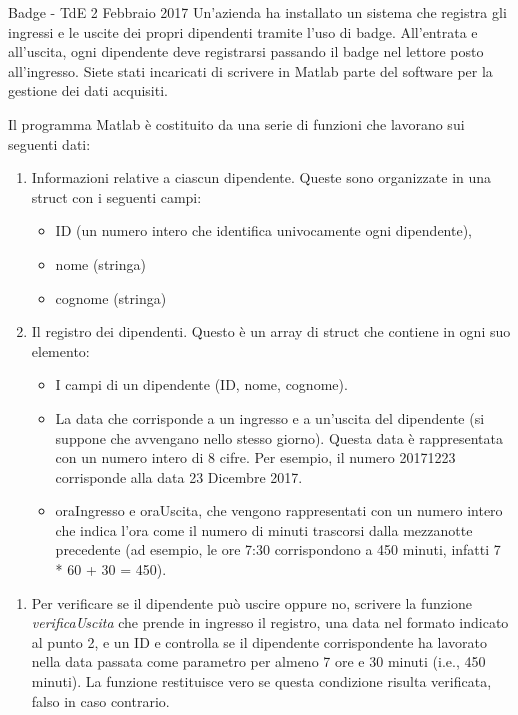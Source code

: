 \documentclass[format=169, 10pt, handout]{beamer}
\begin{document}
\begin{frame}[allowframebreaks]{Badge - TdE 2 Febbraio 2017}
Un'azienda ha installato un sistema che registra gli ingressi e le uscite dei propri dipendenti tramite
l'uso di badge.
All'entrata e all'uscita, ogni dipendente deve registrarsi passando il badge nel lettore
posto all'ingresso.
Siete stati incaricati di scrivere in Matlab parte del software per la gestione dei
dati acquisiti.

\framebreak

Il programma Matlab è costituito da una serie di funzioni che lavorano sui seguenti dati:
\begin{enumerate}
\item Informazioni relative a ciascun dipendente. Queste sono organizzate in una struct con i
seguenti campi:
\begin{itemize}
\item ID (un numero intero che identifica univocamente ogni dipendente),
\item nome (stringa)
\item  cognome (stringa)
\end{itemize}
\item Il registro dei dipendenti. Questo è un array di struct che contiene in ogni suo elemento:
\begin{itemize}
\item I campi di un dipendente (ID, nome, cognome).
\item La data che corrisponde a un ingresso e a un’uscita del dipendente (si suppone che
avvengano nello stesso giorno).
 Questa data è rappresentata con un numero intero di 8 cifre. Per esempio, il numero 20171223 corrisponde alla data 23 Dicembre 2017.
\item oraIngresso e oraUscita, che vengono rappresentati con un numero intero che indica
l’ora come il numero di minuti trascorsi dalla mezzanotte precedente (ad esempio, le
ore 7:30 corrispondono a 450 minuti, infatti 7 * 60 + 30 = 450).
\end{itemize}
\end{enumerate}

\framebreak

\begin{enumerate}
	\item Per verificare se il dipendente può uscire oppure no, scrivere la funzione \emph{verificaUscita} che prende in ingresso il registro, una data nel formato indicato al punto 2, e un ID e controlla se il
dipendente corrispondente ha lavorato nella data passata come parametro per almeno 7 ore e 30
minuti (i.e., 450 minuti). La funzione restituisce vero se questa condizione risulta verificata, falso in
caso contrario.


\end{enumerate}
\end{frame}
\end{document}
